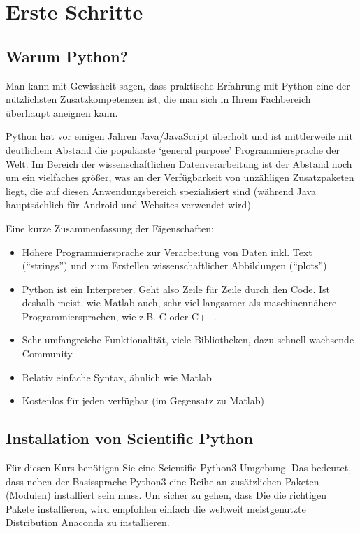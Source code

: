 \chapter{Erste Schritte}

\section{Warum Python?}

Man kann mit Gewissheit sagen, dass praktische Erfahrung mit Python eine der n\"utzlichsten Zusatzkompetenzen ist, die man sich in Ihrem Fachbereich \"uberhaupt aneignen kann.

Python hat vor einigen Jahren Java/JavaScript \"uberholt und ist mittlerweile mit deutlichem Abstand die \href{https://pypl.github.io/PYPL.html}{popul\"arste `general purpose' Programmiersprache der Welt}.
Im Bereich der wissenschaftlichen Datenverarbeitung ist der Abstand noch um ein vielfaches gr\"oßer, was an der Verf\"ugbarkeit von unz\"ahligen Zusatzpaketen liegt, die auf diesen Anwendungsbereich spezialisiert sind (w\"ahrend Java haupts\"achlich f\"ur Android und Websites verwendet wird).

Eine kurze Zusammenfassung der Eigenschaften:

\begin{itemize}
\item Höhere Programmiersprache zur Verarbeitung von Daten inkl. Text (``strings'') und zum Erstellen wissenschaftlicher Abbildungen (``plots'')
\item
Python ist ein Interpreter. Geht also Zeile für Zeile durch den Code. Ist deshalb meist, wie Matlab auch, sehr viel langsamer als maschinennähere Programmiersprachen, wie z.B. C oder C++.
\item
Sehr umfangreiche Funktionalität, viele Bibliotheken, dazu schnell wachsende Community
\item
Relativ einfache Syntax, ähnlich wie Matlab
\item
Kostenlos f\"ur jeden verfügbar (im Gegensatz zu Matlab)
\end{itemize}



\section{Installation von Scientific Python}

F\"ur diesen Kurs ben\"otigen Sie eine Scientific Python3-Umgebung. 
Das bedeutet, dass neben der Basissprache Python3 eine Reihe an zus\"atzlichen Paketen (Modulen) installiert sein muss.
Um sicher zu gehen, dass Die die richtigen Pakete installieren, wird empfohlen einfach die weltweit meistgenutzte Distribution \href{https://www.anaconda.com/products/individual}{Anaconda} zu installieren.

